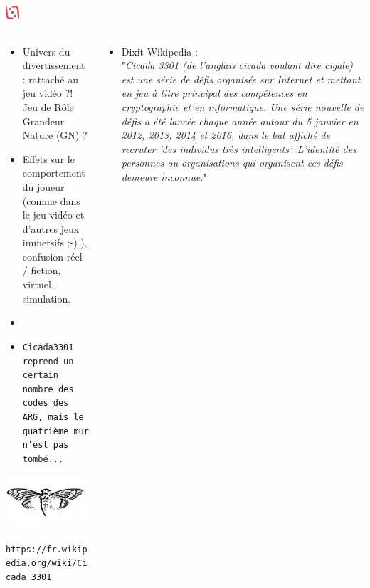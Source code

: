 \documentclass[slidetop,11pt]{beamer}
\def\moreInFrameTitleLeftt{\includegraphics[height=0.5cm]{img/ligueludique-0.png}~~~~~}
\begin{document}
\subsection{\sectionPartIIIe}
\begin{frame}
	\frametitle{\moreInFrameTitleLeftt \sectionPartIIIe}
	\begin{columns}[T]
		\begin{column}[T]{5.05cm}
			\begin{itemize}
				\scriptsize 
				\item Univers du divertissement : rattach{\'e} au jeu vid{\'e}o ?! Jeu de R{\^o}le Grandeur Nature (GN) ?
				\item Effets sur le comportement du joueur (comme dans le jeu vid{\'e}o et d'autres jeux immersifs ;-) ), confusion r{\'e}el / fiction, virtuel, simulation. 
				\item[] 
				\item \texttt{\footnotesize Cicada3301 reprend un certain nombre des codes des ARG, mais le quatri{\`e}me mur n'est pas tomb{\'e}...}
			\end{itemize}
			\includegraphics[width=3.00cm]{img/cicada3301/Cicada_3301_logo.jpg}~\\
			\texttt{\scriptsize https://fr.wikipedia.org/wiki/Cicada\_3301}
		\end{column}
		\begin{column}[T]{5.05cm}
			\begin{itemize}
				\footnotesize 
				\item Dixit Wikipedia : ~\\
					"\emph{Cicada 3301 (de l'anglais cicada voulant dire cigale) est une s{\'e}rie de d{\'e}fis organis{\'e}e sur Internet et mettant en jeu {\`a} titre principal des comp{\'e}tences en cryptographie et en informatique. Une s{\'e}rie nouvelle de d{\'e}fis a {\'e}t{\'e} lanc{\'e}e chaque ann{\'e}e autour du 5 janvier en 2012, 2013, 2014 et 2016, dans le but affich{\'e} de recruter 'des individus tr{\`e}s intelligents'. L'identit{\'e} des personnes ou organisations qui organisent ces d{\'e}fis demeure inconnue.}"
			\end{itemize}
		\end{column}
	\end{columns}
\end{frame}
\end{document}
